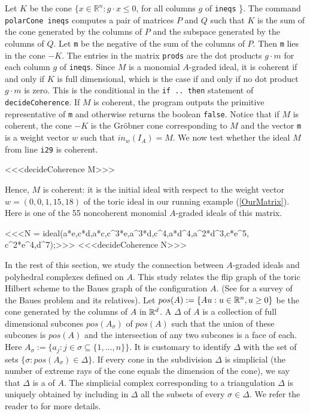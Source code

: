 Let $K$ be the cone $\{x \in {\mathbb R}^n : g \cdot x \leq 0$,
for all columns $g$ of {\tt ineqs} \}. The command {\tt
polarCone ineqs} computes a pair of matrices $P$ and $Q$ such
that $K$ is the sum of the cone generated by the columns of $P$
and the subspace generated by the columns of $Q$. Let {\tt m} be
the negative of the sum of the columns of $P$. Then {\tt m} lies
in the cone $-K$. The entries in the matrix {\tt prods} are the
dot products $g \cdot m$ for each column $g$ of {\tt ineqs}.
Since $M$ is a monomial $A$-graded ideal, it is coherent if and
only if $K$ is full dimensional, which is the case if and only if
no dot product $g \cdot m$ is zero. This is the conditional in
the {\tt if .. then} statement of {\tt decideCoherence}. If $M$
is coherent, the program outputs the primitive representative of
{\tt m} and otherwise returns the boolean {\tt false}. Notice that 
if $M$ is coherent, the cone $-K$ is the Gr\"obner cone corresponding 
to $M$ and the vector {\tt m} is a weight vector $w$ such that
$in_w(I_A) = M$. We now test whether the ideal $M$ from 
line {\tt i29} is coherent.

<<<decideCoherence M>>>

Hence, $M$ is coherent: it is the initial ideal with respect to the 
weight vector $w = (0,0,1,15,18)$ of the toric ideal in our running
example (\ref{OurMatrix}). Here is one of the 55 noncoherent
monomial $A$-graded ideals of this matrix.

<<<N = ideal(a*e,c*d,a*c,c^3*e,a^3*d,c^4,a*d^4,a^2*d^3,c*e^5,
           c^2*e^4,d^7);>>>
<<<decideCoherence N>>>

In the rest of this section, we study the connection between
$A$-graded ideals and polyhedral complexes defined on $A$.  This study
relates the flip graph of the toric Hilbert scheme to the Baues
graph of the configuration $A$.                  (See \cite{HS:Reiner} for a
survey of the Baues problem and its relatives).  Let $pos(A) := \{ Au
: u \in \mathbb{R}^n, u \geq 0 \}$ be the cone generated by the columns of $A$
in $\mathbb{R}^d$. A {\em {}} $\Delta$ of $A$ is a
collection of full dimensional subcones $pos(A_{\sigma})$ of $pos(A)$
such that the union of these subcones is $pos(A)$ and the intersection
of any two subcones is a face of each.  Here $A_{\sigma} := \{a_j : j
\in \sigma \subseteq \{1,\ldots,n\} \}$.  It is customary to identify 
$\Delta$ with the set of sets $\{ \sigma : pos(A_{\sigma}) \in \Delta
\}$. If every cone in the 
subdivision $\Delta$ is simplicial (the number of extreme rays of the
cone equals the dimension of the cone), we say that $\Delta$ is a {\em
  } of $A$. The simplicial complex corresponding
to a triangulation $\Delta$ is uniquely obtained by including in
$\Delta$ all the subsets of every $\sigma \in \Delta$. We refer the
reader to \cite[\S 8]{HS:St2} for more details.

